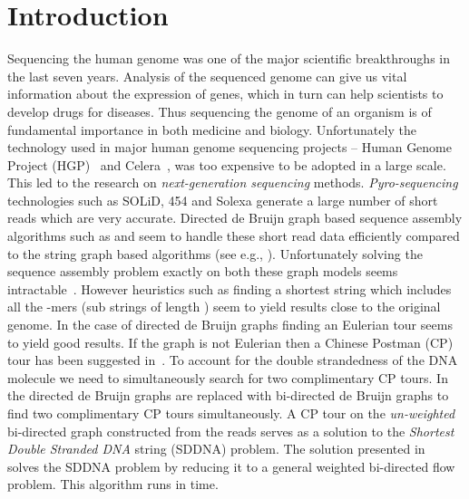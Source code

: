 \documentclass[runningheads]{llncs}
\begin{document}
\section{Introduction}

Sequencing the human genome was one of the major scientific breakthroughs in the 
last seven years. Analysis of the sequenced genome can give us vital information about the
expression of genes, which in turn can help scientists to develop drugs for diseases. Thus
sequencing the genome of an organism is of fundamental importance in both medicine and biology.
Unfortunately the technology used in major human genome sequencing projects -- Human Genome
Project (HGP)~\cite{hgp_project} and Celera~\cite{celera_project}, was too expensive to be 
adopted in a large scale. This led to the research on {\em next-generation sequencing} 
methods. {\em Pyro-sequencing} technologies such as SOLiD, 454 and Solexa generate a large number of
short reads which are very accurate. Directed de Bruijn graph based sequence assembly 
algorithms such as \cite{velvet08} and \cite{pevzner01} seem to handle these short read data efficiently 
compared to the string graph based algorithms (see e.g., \cite{myers05}). Unfortunately solving the sequence 
assembly problem exactly on both these graph models seems intractable~\cite{bidirected_graph}. 
However heuristics such as finding a shortest string which includes all the -mers (sub strings 
of length ) seem to yield results close to the original genome. In the case of directed de Bruijn graphs finding an Eulerian tour seems to yield good results. If the graph is not Eulerian then a Chinese Postman (CP) tour has been suggested in~\cite{pevzner01}.
 To account for the double strandedness of the DNA molecule we need to simultaneously search for two complimentary CP tours. 
In~\cite{bidirected_graph} the directed de Bruijn graphs are replaced with bi-directed de Bruijn 
graphs to find two complimentary CP tours simultaneously. A CP tour on the {\em un-weighted} 
bi-directed graph constructed from the reads serves as a solution to the {\em Shortest Double Stranded DNA}  string (SDDNA) problem. The solution presented 
in~\cite{bidirected_graph} solves the SDDNA problem by reducing it to a general weighted bi-directed 
flow problem. This algorithm runs in  time. 
\end{document}
